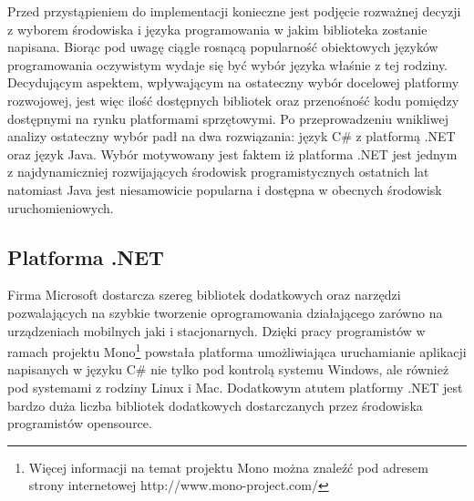 Przed przystąpieniem do implementacji konieczne jest podjęcie rozważnej decyzji z
wyborem środowiska i języka programowania w jakim biblioteka zostanie napisana.
Biorąc pod uwagę ciągle rosnącą popularność obiektowych języków programowania
oczywistym wydaje się być wybór języka właśnie z tej rodziny. Decydującym
aspektem, wpływającym na ostateczny wybór docelowej platformy rozwojowej, jest
więc ilość dostępnych bibliotek oraz przenośność kodu pomiędzy dostępnymi na
rynku platformami sprzętowymi. Po przeprowadzeniu wnikliwej analizy ostateczny
wybór padł na dwa rozwiązania: język C\# z platformą .NET oraz język Java. 
Wybór motywowany jest faktem iż platforma .NET jest jednym z najdynamiczniej rozwijających środowisk
programistycznych ostatnich lat natomiast Java jest niesamowicie popularna i dostępna w obecnych środowisk uruchomieniowych. 

\subsection{Platforma .NET}
Firma Microsoft dostarcza szereg bibliotek dodatkowych oraz narzędzi pozwalających na szybkie tworzenie oprogramowania
działającego zarówno na urządzeniach mobilnych jaki i stacjonarnych. Dzięki
pracy programistów w ramach projektu Mono\footnote{Więcej informacji na temat projektu
Mono można znaleźć pod adresem strony internetowej http://www.mono-project.com/}
powstała platforma umożliwiająca uruchamianie aplikacji napisanych w języku C\#
nie tylko pod kontrolą systemu Windows, ale również pod systemami z rodziny Linux
i Mac. Dodatkowym atutem platformy .NET jest bardzo duża liczba bibliotek
dodatkowych dostarczanych przez środowiska programistów opensource.

